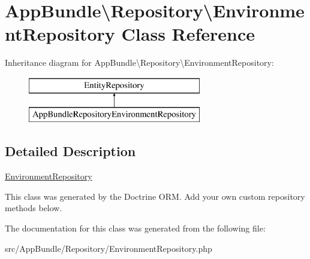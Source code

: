 \hypertarget{class_app_bundle_1_1_repository_1_1_environment_repository}{}\section{App\+Bundle\textbackslash{}Repository\textbackslash{}Environment\+Repository Class Reference}
\label{class_app_bundle_1_1_repository_1_1_environment_repository}
Inheritance diagram for App\+Bundle\textbackslash{}Repository\textbackslash{}Environment\+Repository\+:\begin{figure}[H]
\begin{center}
\leavevmode
\includegraphics[height=2.000000cm]{class_app_bundle_1_1_repository_1_1_environment_repository}
\end{center}
\end{figure}


\subsection{Detailed Description}
\mbox{\hyperlink{class_app_bundle_1_1_repository_1_1_environment_repository}{Environment\+Repository}}

This class was generated by the Doctrine O\+RM. Add your own custom repository methods below. 

The documentation for this class was generated from the following file\+:\begin{DoxyCompactItemize}
\item 
src/\+App\+Bundle/\+Repository/Environment\+Repository.\+php\end{DoxyCompactItemize}
